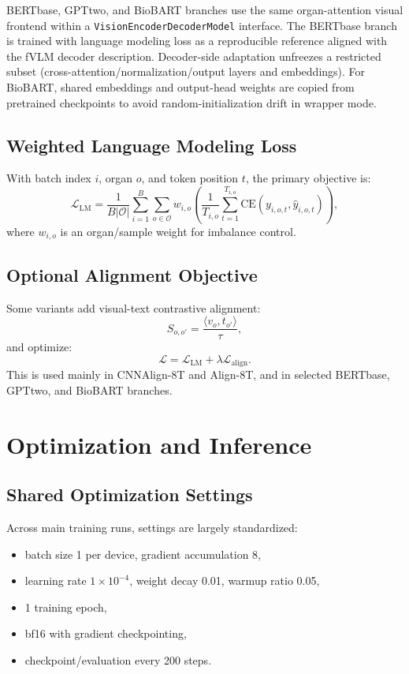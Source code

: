 \ac{BERTbase}, \ac{GPTtwo}, and BioBART branches use the same organ-attention visual frontend within a \texttt{VisionEncoderDecoderModel} interface. The \ac{BERTbase} branch is trained with language modeling loss as a reproducible reference aligned with the fVLM decoder description. Decoder-side adaptation unfreezes a restricted subset (cross-attention/normalization/output layers and embeddings). For BioBART, shared embeddings and output-head weights are copied from pretrained checkpoints to avoid random-initialization drift in wrapper mode.

\subsection{Weighted Language Modeling Loss}
With batch index $i$, organ $o$, and token position $t$, the primary objective is:
\begin{equation}
\mathcal{L}_{\mathrm{LM}} = \frac{1}{B|\mathcal{O}|} \sum_{i=1}^{B}\sum_{o\in\mathcal{O}} w_{i,o}
\left(\frac{1}{T_{i,o}}\sum_{t=1}^{T_{i,o}} \mathrm{CE}(y_{i,o,t}, \hat{y}_{i,o,t})\right),
\end{equation}
where $w_{i,o}$ is an organ/sample weight for imbalance control.

\subsection{Optional Alignment Objective}
Some variants add visual-text contrastive alignment:
\begin{equation}
S_{o,o'} = \frac{\langle v_o, t_{o'} \rangle}{\tau},
\end{equation}
and optimize:
\begin{equation}
\mathcal{L} = \mathcal{L}_{\mathrm{LM}} + \lambda \mathcal{L}_{\mathrm{align}}.
\end{equation}
This is used mainly in CNNAlign-8T and Align-8T, and in selected \ac{BERTbase}, \ac{GPTtwo}, and BioBART branches.

\section{Optimization and Inference}\label{sec:method_optimization_inference}
\subsection{Shared Optimization Settings}
Across main training runs, settings are largely standardized:
\begin{itemize}
    \item batch size 1 per device, gradient accumulation 8,
    \item learning rate $1\times10^{-4}$, weight decay 0.01, warmup ratio 0.05,
    \item 1 training epoch,
    \item bf16 with gradient checkpointing,
    \item checkpoint/evaluation every 200 steps.
\end{itemize}


